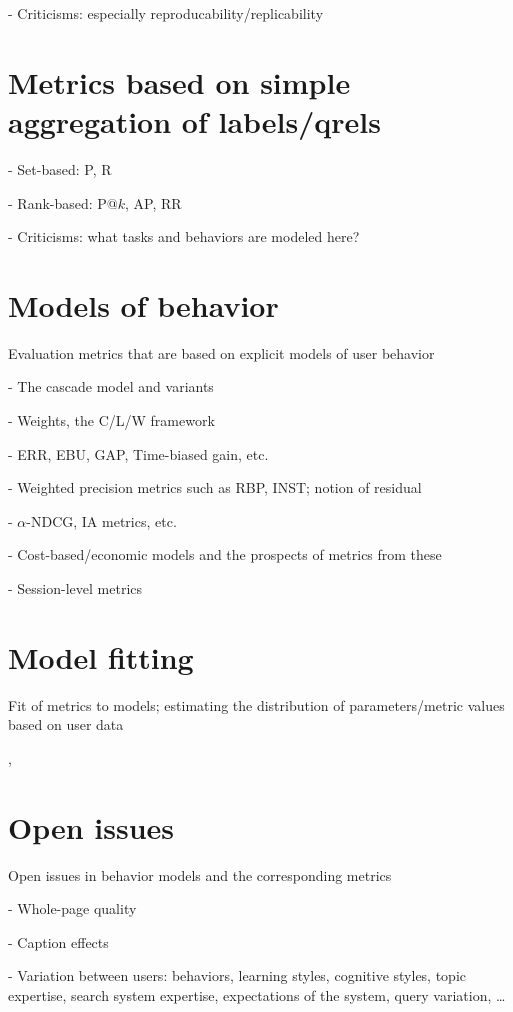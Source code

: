 \documentclass[openany]{now} %
\begin{document}
- Criticisms: especially reproducability/replicability

\section{Metrics based on simple aggregation of labels/qrels}

- Set-based: P, R

- Rank-based: P@$k$, AP, RR

- Criticisms: what tasks and behaviors are modeled here?

\section{Models of behavior}

Evaluation metrics that are based on explicit models of user behavior

- The cascade model and variants

- Weights, the C/L/W framework \citep{Moffat2013}

- ERR, EBU, GAP, Time-biased gain, etc.

- Weighted precision metrics such as RBP, INST; notion of residual \citep{Moffat08,Moffat15}

- $\alpha$-NDCG, IA metrics, etc.

- Cost-based/economic models and the prospects of metrics from these

- Session-level metrics \cite{kanoulas2011evaluating} \cite{Järvelin2008}

\section{Model fitting}

Fit of metrics to models; estimating the distribution of parameters/metric values based on user data

\cite{CarteretteKY11}, \cite{Moffat2013}

\section{Open issues}

Open issues in behavior models and the corresponding metrics

- Whole-page quality

- Caption effects

- Variation between users: behaviors, learning styles, cognitive styles, topic expertise, search system expertise, expectations of the system, query variation, \dots
\end{document}
